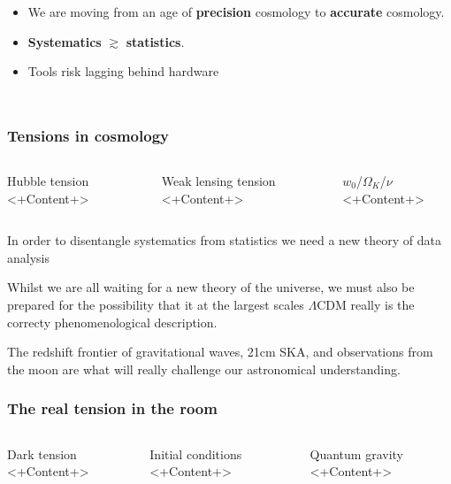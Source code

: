 \documentclass[aspectratio=169, handout]{beamer}
\begin{document}
\begin{frame}
\begin{columns}
        \begin{itemize}
            \item We are moving from an age of \textbf{precision} cosmology to \textbf{accurate} cosmology.
            \item \textbf{Systematics} $\gtrsim$ \textbf{statistics}.
            \item Tools risk lagging behind hardware
        \end{itemize}

    \end{columns}
\end{frame}

\begin{frame}
    \frametitle{Tensions in cosmology}
    \begin{columns}
        \begin{block}{Hubble tension}
            <+Content+>
        \end{block}
        \begin{block}{Weak lensing tension}
            <+Content+>
        \end{block}
        \begin{block}{$w_0$/$\Omega_K$/$\nu$}
            <+Content+>
        \end{block}
    \end{columns}

    In order to disentangle systematics from statistics we need a new theory of data analysis

    Whilst we are all waiting for a new theory of the universe, we must also be prepared for the possibility that it at the largest scales $\Lambda$CDM really is the correcty phenomenological description.

    The redshift frontier of gravitational waves, 21cm SKA, and observations from the moon are what will really challenge our astronomical understanding.

\end{frame}

\begin{frame}
    \frametitle{The real tension in the room}

    \begin{columns}
        \begin{block}{Dark tension}
            <+Content+>
        \end{block}
        \begin{block}{Initial conditions}
            <+Content+>
        \end{block}
        \begin{block}{Quantum gravity}
            <+Content+>
        \end{block}
    \end{columns}
\end{frame}
\end{document}
